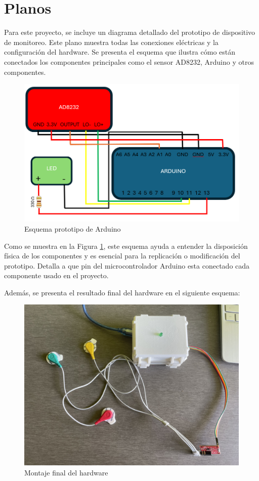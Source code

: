 
\section{Planos}

Para este proyecto, se incluye un diagrama detallado del prototipo de dispositivo de monitoreo. Este plano muestra todas las conexiones eléctricas y la configuración del hardware. Se presenta el esquema que ilustra cómo están conectados los componentes principales como el sensor AD8232, Arduino y otros componentes.

\begin{figure}[h]
\centering
\includegraphics[width=\textwidth]{img/esquema.png}
\caption{Esquema prototipo de Arduino}
\label{fig:esquema}
\end{figure}

Como se muestra en la Figura \ref{fig:esquema}, este esquema ayuda a entender la disposición física de los componentes y es esencial para la replicación o modificación del prototipo. Detalla a que pin del microcontrolador Arduino esta conectado cada componente usado en el proyecto.

Además, se presenta el resultado final del hardware en el siguiente esquema:

\begin{figure}[h]
\centering
\includegraphics[width=\textwidth]{img/proyecto.jpg}
\caption{Montaje final del hardware}
\label{fig:final}
\end{figure}

